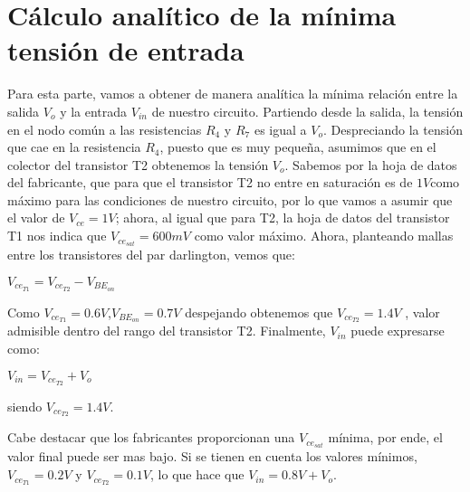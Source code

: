\documentclass[e2_tp1_main.tex]{subfiles}
\begin{document}
\section{Cálculo analítico de la mínima tensión de entrada}
Para esta parte, vamos a obtener de manera analítica la mínima relación entre la salida $V_o$ y la entrada $V_{in}$ de nuestro circuito. Partiendo desde la salida, la tensión en el nodo común a las resistencias $R_4$ y $R_7$ es igual a $V_o$. Despreciando la tensión que cae en la resistencia $R_4$, puesto que es muy pequeña, asumimos que en el colector del transistor T2 obtenemos la tensión $V_o$.
Sabemos por la hoja de datos del fabricante, que para que el transistor T2 no entre en saturación es de $1 V$como máximo para las condiciones de nuestro circuito, por lo que vamos a asumir que el valor de $V_{ce}=1 V$; ahora, al igual que para T2, la hoja de datos del transistor T1 nos indica que  $V_{ce_{sat}}=600mV$ como valor máximo. 
Ahora, planteando mallas entre los transistores del par darlington, vemos que:
\begin{center}
{\large{}$ V_{ce_{T1}}=V_{ce_{T2}}-V_{BE_{on}}$}{\large\par}
\par\end{center}
Como $V_{ce_{T1}}=0.6V$,$V_{BE_{on}}=0.7V$ despejando obtenemos que $V_{ce_{T2}}=1.4V$ , valor admisible dentro del rango del transistor T2.
Finalmente, $V_{in}$ puede expresarse como:
\begin{center}
{\large{}$ V_{in}=V_{ce_{T2}}+V_{o}$}{\large\par}
\par\end{center}

siendo $V_{ce_{T2}}=1.4 V$.

Cabe destacar que los fabricantes proporcionan una $V_{ce_{sat}}$ mínima, por ende, el valor final puede ser mas bajo. Si se tienen en cuenta los valores mínimos, $V_{ce_{T1}}=0.2V$ y $V_{ce_{T2}}=0.1V$, lo que hace que $ V_{in}=0.8V+V_{o}$.
\end{document}

